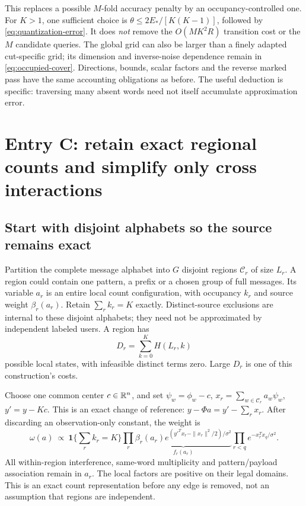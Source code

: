 \documentclass[10pt,a4paper]{article}
\newcommand{\ind}{\mathbf 1}
\begin{document}
This replaces a possible $M$-fold accuracy penalty by an occupancy-controlled one. For $K>1$, one sufficient
choice is $\theta\leq2E_*/[K(K-1)]$, followed by \eqref{eq:quantization-error}. It does \emph{not} remove the
$O(MK^2R)$ transition cost or the $M$ candidate queries. The global grid can also be larger than a finely
adapted cut-specific grid; its dimension and inverse-noise dependence remain in \eqref{eq:occupied-cover}.
Directions, bounds, scalar factors and the reverse marked pass have the same accounting obligations as
before. The useful deduction is specific: traversing many absent words need not itself accumulate
approximation error.

\clearpage
\section{Entry C: retain exact regional counts and simplify only cross interactions}
\label{sec:entry-regions}
\subsection{Start with disjoint alphabets so the source remains exact}
Partition the complete message alphabet into $G$ disjoint regions $\mathcal C_r$ of size $L_r$. A region
could contain one pattern, a prefix or a chosen group of full messages. Its variable $a_r$ is an entire local
count configuration, with occupancy $k_r$ and source weight $\beta_r(a_r)$. Retain $\sum_r k_r=K$ exactly.
Distinct-source exclusions are internal to these disjoint alphabets; they need not be approximated by
independent labeled users. A region has
\[
 D_r=\sum_{k=0}^K H(L_r,k)
\]
possible local states, with infeasible distinct terms zero. Large $D_r$ is one of this construction's costs.

Choose one common center $c\in\mathbb{R}^n$, and set
$\psi_w=\phi_w-c$, $x_r=\sum_{w\in\mathcal C_r}a_w\psi_w$, $y'=y-Kc$. This is an exact change of reference:
$y-\Phi a=y'-\sum_r x_r$. After discarding an observation-only constant, the weight is
\begin{equation}
 \omega(a)\ \propto\ \ind\{\textstyle\sum_r k_r=K\}
 \prod_r \underbrace{\beta_r(a_r)
 e^{(y'^Tx_r-\|x_r\|^2/2)/\sigma^2}}_{f_r(a_r)}
 \prod_{r<q}e^{-x_r^Tx_q/\sigma^2}.
 \label{eq:regional-exact}
\end{equation}
All within-region interference, same-word multiplicity and pattern/payload association remain in $a_r$.
The local factors are positive on their legal domains. This is an exact count representation before any
edge is removed, not an assumption that regions are independent.
\end{document}
